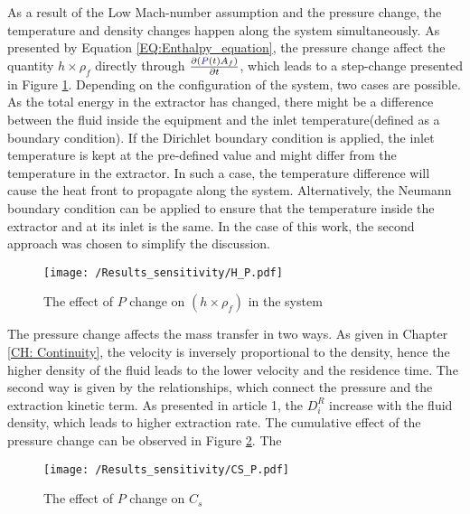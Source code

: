 \documentclass[../Article_Model_Parameters.tex]{subfiles}
\begin{document}
	As a result of the Low Mach-number assumption and the pressure change, the temperature and density changes happen along the system simultaneously. As presented by Equation \ref{EQ:Enthalpy_equation}, the pressure change affect the quantity $h \times \rho_f$ directly through $\frac{\partial ({\color{blue}P}(t) A_f)}{\partial t}$, which leads to a step-change presented in Figure \ref{fig:Sensitivty_P_H}. Depending on the configuration of the system, two cases are possible. As the total energy in the extractor has changed, there might be a difference between the fluid inside the equipment and the inlet temperature(defined as a boundary condition). If the Dirichlet boundary condition is applied, the inlet temperature is kept at the pre-defined value and might differ from the temperature in the extractor. In such a case, the temperature difference will cause the heat front to propagate along the system. Alternatively, the Neumann boundary condition can be applied to ensure that the temperature inside the extractor and at its inlet is the same. In the case of this work, the second approach was chosen to simplify the discussion.
    
    \begin{figure}[h!]
    	\centering
    	\texttt{[image: /Results\_sensitivity/H\_P.pdf]}
    	\caption{The effect of $P$ change on $(h \times \rho_f)$ in the system}
    	\label{fig:Sensitivty_P_H}
    \end{figure}

	The pressure change affects the mass transfer in two ways. As given in Chapter \ref{CH: Continuity}, the velocity is inversely proportional to the density, hence the higher density of the fluid leads to the lower velocity and the residence time. The second way is given by the relationships, which connect the pressure and the extraction kinetic term. As presented in {\color{red}article 1}, the $D_i^R$ increase with the fluid density, which leads to higher extraction rate. The cumulative effect of the pressure change can be observed in Figure \ref{fig:Sensitivty_P_CS}. The 

	\begin{figure}[h!]
		\centering
		\texttt{[image: /Results\_sensitivity/CS\_P.pdf]}
		\caption{The effect of $P$ change on $C_s$}
		\label{fig:Sensitivty_P_CS}
	\end{figure}
	
\end{document}
